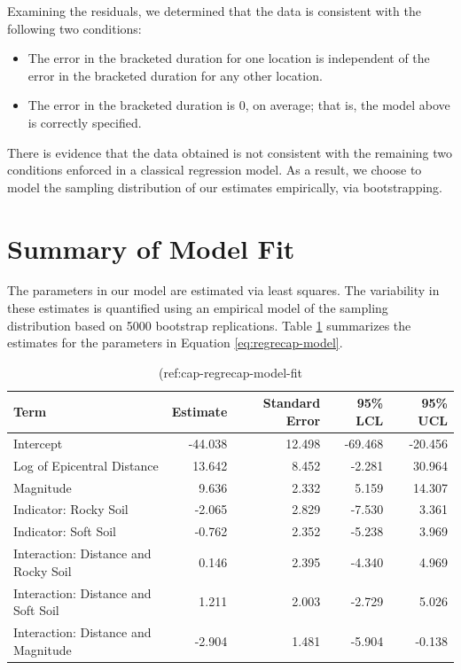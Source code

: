 \documentclass[]{book}
\providecommand{\tightlist}{%
  \setlength{\itemsep}{0pt}\setlength{\parskip}{0pt}}
\theoremstyle{definition}
\theoremstyle{definition}
\theoremstyle{definition}
\theoremstyle{remark}
\begin{document}
Examining the residuals, we determined that the data is consistent with
the following two conditions:

\begin{itemize}
\tightlist
\item
  The error in the bracketed duration for one location is independent of
  the error in the bracketed duration for any other location.
\item
  The error in the bracketed duration is 0, on average; that is, the
  model above is correctly specified.
\end{itemize}

There is evidence that the data obtained is not consistent with the
remaining two conditions enforced in a classical regression model. As a
result, we choose to model the sampling distribution of our estimates
empirically, via bootstrapping.

\section{Summary of Model Fit}\label{summary-of-model-fit}

The parameters in our model are estimated via least squares. The
variability in these estimates is quantified using an empirical model of
the sampling distribution based on 5000 bootstrap replications. Table
\ref{tab:regrecap-model-fit} summarizes the estimates for the parameters
in Equation \eqref{eq:regrecap-model}.





\begin{table}

\caption{\label{tab:regrecap-model-fit}(ref:cap-regrecap-model-fit}
\centering
\begin{tabular}[t]{l|r|r|r|r}
\hline
Term & Estimate & Standard Error & 95\% LCL & 95\% UCL\\
\hline
Intercept & -44.038 & 12.498 & -69.468 & -20.456\\
\hline
Log of Epicentral Distance & 13.642 & 8.452 & -2.281 & 30.964\\
\hline
Magnitude & 9.636 & 2.332 & 5.159 & 14.307\\
\hline
Indicator: Rocky Soil & -2.065 & 2.829 & -7.530 & 3.361\\
\hline
Indicator: Soft Soil & -0.762 & 2.352 & -5.238 & 3.969\\
\hline
Interaction: Distance and Rocky Soil & 0.146 & 2.395 & -4.340 & 4.969\\
\hline
Interaction: Distance and Soft Soil & 1.211 & 2.003 & -2.729 & 5.026\\
\hline
Interaction: Distance and Magnitude & -2.904 & 1.481 & -5.904 & -0.138\\
\hline
\end{tabular}
\end{table}
\end{document}
